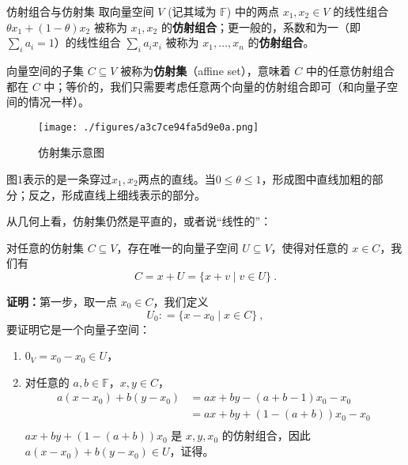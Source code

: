 
\begin{issues}
\issueTODO
\end{issues}



\begin{definition}{仿射组合与仿射集}\label{def_AffSet_1}
取向量空间 $V$ (记其域为 $\mathbb{F}$) 中的两点 $x_1, x_2 \in V$ 的线性组合 $\theta x_1 + (1 - \theta) x_2$ 被称为 $x_1, x_2$ 的\textbf{仿射组合}；更一般的，系数和为一（即$\sum_i a_i = 1$）的线性组合 $\sum_i a_i x_i$ 被称为 $x_1, \dots, x_n$ 的\textbf{仿射组合}。

向量空间的子集 $C \subseteq V$ 被称为\textbf{仿射集}（affine set），意味着 $C$ 中的任意仿射组合都在 $C$ 中；等价的，我们只需要考虑任意两个向量的仿射组合即可（和向量子空间的情况一样）。
\end{definition}

\begin{figure}[ht]
\centering
\texttt{[image: ./figures/a3c7ce94fa5d9e0a.png]}
\caption{仿射集示意图} \label{fig_AffSet_1}
\end{figure}

图$1$表示的是一条穿过$x_1,x_2$两点的直线。当$0 \leq \theta \leq 1$，形成图中直线加粗的部分；反之，形成直线上细线表示的部分。

从几何上看，仿射集仍然是平直的，或者说“线性的”：

\begin{theorem}{}
对任意的仿射集 $C \subseteq V$，存在唯一的向量子空间 $U \subseteq V$，使得对任意的 $x \in C$，我们有
\begin{equation}
C = x + U = \{ x + v \mid v \in U\}~.
\end{equation}
\end{theorem}

\textbf{证明：}第一步，取一点 $x_0 \in C$，我们定义
\begin{equation}
U_0: = \{ x - x_0 \mid x \in C \}~,
\end{equation}
要证明它是一个向量子空间：
\begin{enumerate}
\item $0_V = x_0 - x_0 \in U$，
\item 对任意的 $a, b \in \mathbb{F}$，$x, y \in C$，
    \begin{equation}
    \begin{aligned}
    a (x - x_0) + b (y - x_0) &= a x + b y - (a + b - 1) x_0 - x_0 \\
    &= a x + b y + (1 - (a + b)) x_0 - x_0 \\
    \end{aligned}~
    \end{equation}
$a x + b y + (1 - (a + b)) x_0$ 是 $x, y, x_0$ 的仿射组合，因此 $a (x - x_0) + b (y - x_0) \in U$，证得。
\end{enumerate}

